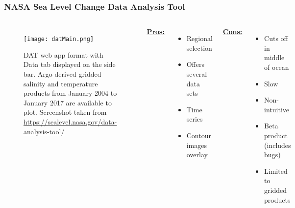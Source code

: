 \begin{frame}
\frametitle{NASA Sea Level Change Data Analysis Tool}
\begin{columns}
\begin{figure}
\begin{minipage}{1\columnwidth}
\centering
\texttt{[image: datMain.png]}
\caption{\tiny{DAT web app format with Data tab displayed on the side bar. Argo derived gridded salinity and temperature products from January 2004 to January 2017 are available to plot. Screenshot taken from \url{https://sealevel.nasa.gov/data-analysis-tool/}}}
\end{minipage}
\end{figure}
\small{\underline{\textbf{Pros:}}}
\begin{itemize}
    \item Regional selection
    \item Offers several data sets
    \item Time series
    \item Contour images overlay
\end{itemize}
\small{\underline{\textbf{Cons:}}}
\begin{itemize}
    \item Cuts off in middle of ocean
    \item Slow
    \item Non-intuitive
    \item Beta product (includes bugs)
    \item Limited to gridded products
\end{itemize}
\end{columns}
\end{frame}

